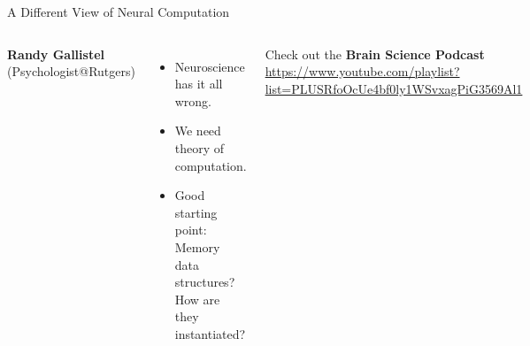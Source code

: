 \documentclass[xcolor={usenames,svgnames,x11names,dvipsnames,table}]{beamer}
\begin{document}
\begin{frame}{A Different View of Neural Computation}
    \begin{columns}
        \textbf{Randy Gallistel} (Psychologist@Rutgers)
        \begin{itemize}
            \item Neuroscience has it all wrong.
            \item We need theory of computation.
            \item Good starting point:\\
                Memory data structures?\\
                How are they instantiated?
        \end{itemize}

        \bigskip
        Check out the \textbf{Brain Science Podcast}\\
        \smallskip
        \url{https://www.youtube.com/playlist?list=PLUSRfoOcUe4bf0ly1WSvxagPiG3569Al1}

        \centering
        \includegraphics[width=6em]{./img/gallistel}\\
        \medskip
        \includegraphics[width=6em]{./img/gallistelkingbook}
    \end{columns}
\end{frame}
\end{document}
